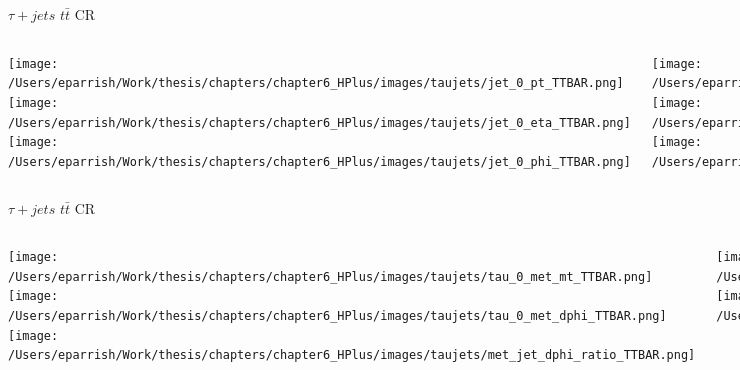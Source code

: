 \documentclass[aspectratio=169,xcolor=table]{beamer}
\begin{document}
    \begin{frame}[t]{$\tau+jets$ $t\bar{t}$ CR}
      \begin{columns}[t]
          \texttt{[image: /Users/eparrish/Work/thesis/chapters/chapter6\_HPlus/images/taujets/jet\_0\_pt\_TTBAR.png]}
          \texttt{[image: /Users/eparrish/Work/thesis/chapters/chapter6\_HPlus/images/taujets/jet\_0\_eta\_TTBAR.png]}
          \texttt{[image: /Users/eparrish/Work/thesis/chapters/chapter6\_HPlus/images/taujets/jet\_0\_phi\_TTBAR.png]}

          \texttt{[image: /Users/eparrish/Work/thesis/chapters/chapter6\_HPlus/images/taujets/jet\_1\_pt\_TTBAR.png]}
          \texttt{[image: /Users/eparrish/Work/thesis/chapters/chapter6\_HPlus/images/taujets/jet\_1\_eta\_TTBAR.png]}
          \texttt{[image: /Users/eparrish/Work/thesis/chapters/chapter6\_HPlus/images/taujets/jet\_1\_phi\_TTBAR.png]}

          \texttt{[image: /Users/eparrish/Work/thesis/chapters/chapter6\_HPlus/images/taujets/jet\_2\_pt\_TTBAR.png]}
          \texttt{[image: /Users/eparrish/Work/thesis/chapters/chapter6\_HPlus/images/taujets/jet\_2\_eta\_TTBAR.png]}
          \texttt{[image: /Users/eparrish/Work/thesis/chapters/chapter6\_HPlus/images/taujets/jet\_2\_phi\_TTBAR.png]}

          \texttt{[image: /Users/eparrish/Work/thesis/chapters/chapter6\_HPlus/images/taujets/effm\_tau\_TTBAR.png]}

      \end{columns}
    \end{frame}

    \begin{frame}[t]{$\tau+jets$ $t\bar{t}$ CR}
      \begin{columns}[t]
          \texttt{[image: /Users/eparrish/Work/thesis/chapters/chapter6\_HPlus/images/taujets/tau\_0\_met\_mt\_TTBAR.png]}
          \texttt{[image: /Users/eparrish/Work/thesis/chapters/chapter6\_HPlus/images/taujets/tau\_0\_met\_dphi\_TTBAR.png]}
          \texttt{[image: /Users/eparrish/Work/thesis/chapters/chapter6\_HPlus/images/taujets/met\_jet\_dphi\_ratio\_TTBAR.png]}

          \texttt{[image: /Users/eparrish/Work/thesis/chapters/chapter6\_HPlus/images/taujets/bjet\_0\_met\_dphi\_TTBAR.png]}
          \texttt{[image: /Users/eparrish/Work/thesis/chapters/chapter6\_HPlus/images/taujets/bjet\_0\_tau\_0\_dr\_TTBAR.png]}



      \end{columns}
    \end{frame}
   
\end{document}
